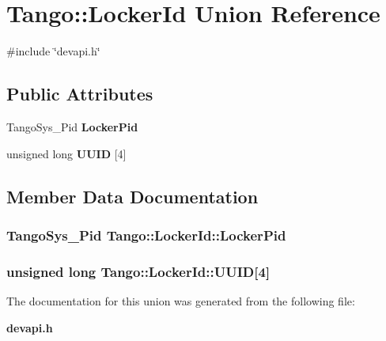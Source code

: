 \section{Tango\-:\-:Locker\-Id Union Reference}
\label{unionTango_1_1LockerId}


{\ttfamily \#include \char`\"{}devapi.\-h\char`\"{}}

\subsection*{Public Attributes}
\begin{DoxyCompactItemize}
\item 
Tango\-Sys\-\_\-\-Pid {\bf Locker\-Pid}
\item 
unsigned long {\bf U\-U\-I\-D} [4]
\end{DoxyCompactItemize}


\subsection{Member Data Documentation}
\subsubsection[{Locker\-Pid}]{\setlength{\rightskip}{0pt plus 5cm}Tango\-Sys\-\_\-\-Pid Tango\-::\-Locker\-Id\-::\-Locker\-Pid}\label{unionTango_1_1LockerId_a9b563ab895bb99554f04e46618290ff1}
\subsubsection[{U\-U\-I\-D}]{\setlength{\rightskip}{0pt plus 5cm}unsigned long Tango\-::\-Locker\-Id\-::\-U\-U\-I\-D[4]}\label{unionTango_1_1LockerId_ad648fc376844a4bc06479a5c37149e22}


The documentation for this union was generated from the following file\-:\begin{DoxyCompactItemize}
\item 
{\bf devapi.\-h}\end{DoxyCompactItemize}
